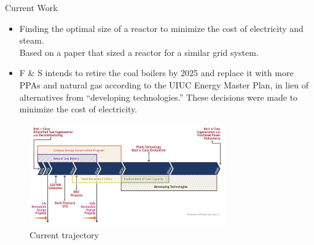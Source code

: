 \begin{frame}
	\large Current Work\\

	\begin{itemize}
		\item Finding the optimal size of a reactor to minimize the cost of electricity and steam. \\
		Based on a paper \cite{baker_optimal_2018} that sized a reactor for a similar grid system. 
		\item F \& S intends to retire the coal boilers by 2025 and replace it with more PPAs and natural gas \cite{affiliated_engineers_inc_utilities_2015} according to the UIUC Energy Master Plan, in lieu of alternatives from ``developing technologies.'' These decisions were made to minimize the cost of electricity.
	\end{itemize}

	\begin{figure}
		\centering
		\label{fig:masterplan}
		\includegraphics[width=0.75\textwidth]{./images/masterplan.png}
		\caption{Current trajectory \cite{affiliated_engineers_inc_utilities_2015}}
	\end{figure}
\end{frame}